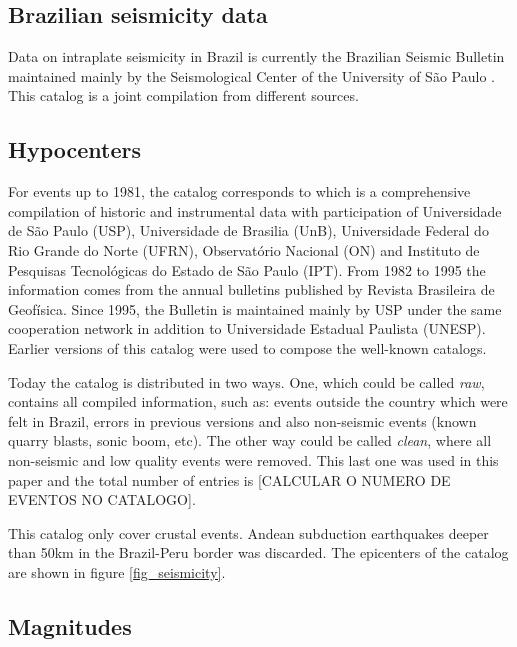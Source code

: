 \documentclass[draft, grl]{agutex}
\begin{document}
\begin{article}
\section{Brazilian seismicity data}

Data on intraplate seismicity in Brazil is currently the Brazilian Seismic Bulletin maintained mainly by the Seismological Center of the University of São Paulo \citep{bsb_2014}. This catalog is a joint compilation from different sources.


\subsection{Hypocenters}

For events up to 1981, the catalog corresponds to \citet{berrocal_1984} which is a comprehensive compilation of historic and instrumental data with participation of Universidade de São Paulo (USP), Universidade de Brasilia (UnB), Universidade Federal do Rio Grande do Norte (UFRN), Observatório Nacional (ON) and Instituto de Pesquisas Tecnológicas do Estado de São Paulo (IPT). From 1982 to 1995 the information comes from the annual bulletins published by Revista Brasileira de Geofísica. Since 1995, the Bulletin is maintained mainly by USP under the same cooperation network in addition to Universidade Estadual Paulista (UNESP). Earlier versions of this catalog were used to compose the well-known \citet{ceresis_1985, ceresis_1995} catalogs.

Today the catalog is distributed in two ways. One, which could be called \emph{raw}, contains all compiled information, such as: events outside the country which were felt in Brazil, errors in previous versions and also non-seismic events (known quarry blasts, sonic boom, etc). The other way could be called \emph{clean}, where all non-seismic and low quality events were removed. This last one was used in this paper and the total number of entries is [CALCULAR O NUMERO DE EVENTOS NO CATALOGO].

This catalog only cover crustal events. Andean subduction earthquakes deeper than 50km in the Brazil-Peru border was discarded. The epicenters of the catalog are shown in figure \ref{fig_seismicity}.



\subsection{Magnitudes}


\end{article}
\end{document}
